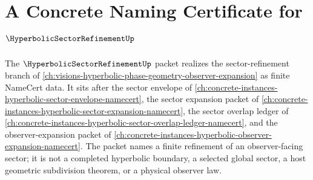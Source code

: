\chapter{A Concrete Naming Certificate for $\HyperbolicSectorRefinementUp$}
\label{ch:concrete-instances-hyperbolic-sector-refinement-namecert}

The $\HyperbolicSectorRefinementUp$ packet realizes the sector-refinement branch of \autoref{ch:visions-hyperbolic-phase-geometry-observer-expansion} as finite NameCert data. It sits after the sector envelope of \autoref{ch:concrete-instances-hyperbolic-sector-envelope-namecert}, the sector expansion packet of \autoref{ch:concrete-instances-hyperbolic-sector-expansion-namecert}, the sector overlap ledger of \autoref{ch:concrete-instances-hyperbolic-sector-overlap-ledger-namecert}, and the observer-expansion packet of \autoref{ch:concrete-instances-hyperbolic-observer-expansion-namecert}. The packet names a finite refinement of an observer-facing sector; it is not a completed hyperbolic boundary, a selected global sector, a host geometric subdivision theorem, or a physical observer law.

